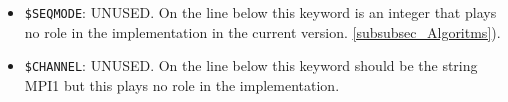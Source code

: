 \begin{itemize}

\item {\tt \$SEQMODE}: UNUSED.  On the line below this keyword is an integer that plays no
role in the implementation in the current version.
  \ref{subsubsec_Algoritms}).

\item {\tt \$CHANNEL}: UNUSED.  On the line below this keyword should be the string
MPI1 but this plays no role in the implementation.


\end{itemize}
